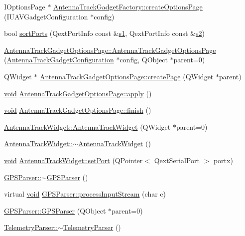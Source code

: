 \begin{DoxyCompactItemize}
\item 
\-I\-Options\-Page $\ast$ \hyperlink{group___antenna_track_gadget_plugin_ga7645577ffc0de3e891b3ea2388c73e48}{\-Antenna\-Track\-Gadget\-Factory\-::create\-Options\-Page} (\-I\-U\-A\-V\-Gadget\-Configuration $\ast$config)
\item 
bool \hyperlink{group___antenna_track_gadget_plugin_ga6244f67dce3641a662a3c15f4eba081b}{sort\-Ports} (\-Qext\-Port\-Info const \&\hyperlink{_o_p_plots_8m_a2f07e0f444810cc4e54ee2be2ce0ac65}{s1}, \-Qext\-Port\-Info const \&\hyperlink{_o_p_plots_8m_a2e63e71737e8b6802b81f6a7c5ca6a0a}{s2})
\item 
\hyperlink{group___antenna_track_gadget_plugin_gaf422edb8885c7e52f91e53e8671ca7e7}{\-Antenna\-Track\-Gadget\-Options\-Page\-::\-Antenna\-Track\-Gadget\-Options\-Page} (\hyperlink{class_antenna_track_gadget_configuration}{\-Antenna\-Track\-Gadget\-Configuration} $\ast$config, \-Q\-Object $\ast$parent=0)
\item 
\-Q\-Widget $\ast$ \hyperlink{group___antenna_track_gadget_plugin_gab61c88a985c6dddb814fbd1dbb7a6455}{\-Antenna\-Track\-Gadget\-Options\-Page\-::create\-Page} (\-Q\-Widget $\ast$parent)
\item 
\hyperlink{group___u_a_v_objects_plugin_ga444cf2ff3f0ecbe028adce838d373f5c}{void} \hyperlink{group___antenna_track_gadget_plugin_gae05ea679125a443f47b6835fb243c3fb}{\-Antenna\-Track\-Gadget\-Options\-Page\-::apply} ()
\item 
\hyperlink{group___u_a_v_objects_plugin_ga444cf2ff3f0ecbe028adce838d373f5c}{void} \hyperlink{group___antenna_track_gadget_plugin_ga21f19cc8645a21200da9d3489a2a4bdf}{\-Antenna\-Track\-Gadget\-Options\-Page\-::finish} ()
\item 
\hyperlink{group___antenna_track_gadget_plugin_ga267d3ecf78fda6b906d043097dd0aa45}{\-Antenna\-Track\-Widget\-::\-Antenna\-Track\-Widget} (\-Q\-Widget $\ast$parent=0)
\item 
\hyperlink{group___antenna_track_gadget_plugin_gaee8823dccf11047cf563237c1f8e4864}{\-Antenna\-Track\-Widget\-::$\sim$\-Antenna\-Track\-Widget} ()
\item 
\hyperlink{group___u_a_v_objects_plugin_ga444cf2ff3f0ecbe028adce838d373f5c}{void} \hyperlink{group___antenna_track_gadget_plugin_gafe776706c20e81410397bf737b254c56}{\-Antenna\-Track\-Widget\-::set\-Port} (\-Q\-Pointer$<$ \-Qext\-Serial\-Port $>$ portx)
\item 
\hyperlink{group___antenna_track_gadget_plugin_ga6773ae49e6fecc274191f0d0e29294d8}{\-G\-P\-S\-Parser\-::$\sim$\-G\-P\-S\-Parser} ()
\item 
virtual \hyperlink{group___u_a_v_objects_plugin_ga444cf2ff3f0ecbe028adce838d373f5c}{void} \hyperlink{group___antenna_track_gadget_plugin_ga0d2ef23accd7d2cd3e098012f2f8e948}{\-G\-P\-S\-Parser\-::process\-Input\-Stream} (char c)
\item 
\hyperlink{group___antenna_track_gadget_plugin_ga15bb435154bfad7f732bc090c496915e}{\-G\-P\-S\-Parser\-::\-G\-P\-S\-Parser} (\-Q\-Object $\ast$parent=0)
\item 
\hyperlink{group___antenna_track_gadget_plugin_ga9a05a4fb6f18cdc568bc4e8f52534977}{\-Telemetry\-Parser\-::$\sim$\-Telemetry\-Parser} ()
\end{DoxyCompactItemize}
